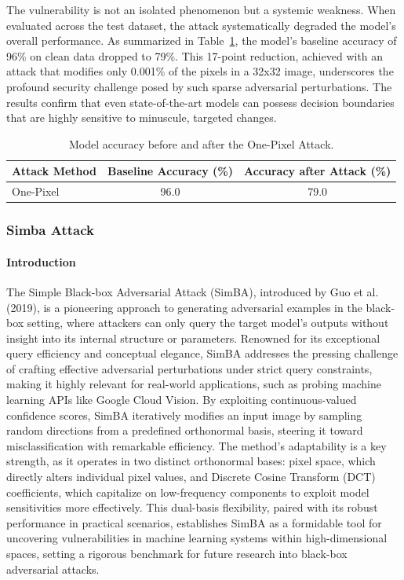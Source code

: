 \documentclass[../main.tex]{subfiles}
\begin{document}
The vulnerability is not an isolated phenomenon but a systemic weakness. When evaluated across the test dataset, the attack systematically degraded the model's overall performance. As summarized in Table~\ref{tab:one_pixel_accuracy}, the model's baseline accuracy of 96\% on clean data dropped to 79\%. This 17-point reduction, achieved with an attack that modifies only 0.001\% of the pixels in a 32x32 image, underscores the profound security challenge posed by such sparse adversarial perturbations. The results confirm that even state-of-the-art models can possess decision boundaries that are highly sensitive to minuscule, targeted changes.

\begin{table}[H]
    \centering
    \caption{Model accuracy before and after the One-Pixel Attack.}
    \label{tab:one_pixel_accuracy}
    \begin{tabular}{lcc}
        \toprule
        \textbf{Attack Method} & \textbf{Baseline Accuracy (\%)} & \textbf{Accuracy after Attack (\%)} \\
        \midrule
        One-Pixel & 96.0 & 79.0 \\
        \bottomrule
    \end{tabular}
\end{table}

\subsubsection{Simba Attack}
\paragraph{Introduction}


The Simple Black-box Adversarial Attack (SimBA), introduced by Guo et al. (2019), is a pioneering approach to generating adversarial examples in the black-box setting, where attackers can only query the target model's outputs without insight into its internal structure or parameters. Renowned for its exceptional query efficiency and conceptual elegance, SimBA addresses the pressing challenge of crafting effective adversarial perturbations under strict query constraints, making it highly relevant for real-world applications, such as probing machine learning APIs like Google Cloud Vision.\cite{guo2019simple} By exploiting continuous-valued confidence scores, SimBA iteratively modifies an input image by sampling random directions from a predefined orthonormal basis, steering it toward misclassification with remarkable efficiency. The method’s adaptability is a key strength, as it operates in two distinct orthonormal bases: pixel space, which directly alters individual pixel values, and Discrete Cosine Transform (DCT) coefficients, which capitalize on low-frequency components to exploit model sensitivities more effectively. This dual-basis flexibility, paired with its robust performance in practical scenarios, establishes SimBA as a formidable tool for uncovering vulnerabilities in machine learning systems within high-dimensional spaces, setting a rigorous benchmark for future research into black-box adversarial attacks.
\cite{kumar2020black}
\end{document}
